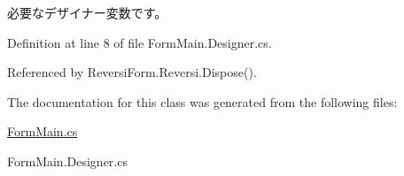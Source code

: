 必要なデザイナー変数です。 



Definition at line 8 of file Form\+Main.\+Designer.\+cs.



Referenced by Reversi\+Form.\+Reversi.\+Dispose().



The documentation for this class was generated from the following files\+:\begin{DoxyCompactItemize}
\item 
\hyperlink{_form_main_8cs}{Form\+Main.\+cs}\item 
Form\+Main.\+Designer.\+cs\end{DoxyCompactItemize}
